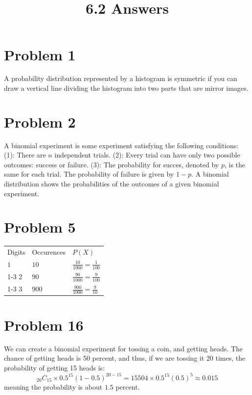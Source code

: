 \documentclass{article}
\title{6.2 Answers}
\theoremstyle{definition}
\newcommand{\?}{\stackrel{?}{=}}
\begin{document}
\maketitle

\section*{Problem 1}
A probability distribution represented by a histogram is symmetric if you can draw a vertical line dividing the histogram into two parts that 
are mirror images.

\section*{Problem 2}
A binomial experiment is some experiment satisfying the following conditions:\newline
(1): There are $n$ independent trials.\newline
(2): Every trial can have only two possible outcomes: success or failure.\newline
(3): The probability for succes, denoted by $p$, is the same for each trial. The probability of failure is given by $1-p$.\newline
A binomial distribution shows the probabilities of the outcomes of a given binomial experiment.

\section*{Problem 5}
\begin{center}
\begin{tabular}{l|l|l}
Digits & Occurences & $P(X)$ \\
$1$ & $10$ & $\frac{10}{1000}=\frac{1}{100}$ \\
\cmidrule{1-3}
$2$ & $90$ & $\frac{90}{1000}=\frac{9}{100}$ \\
\cmidrule{1-3}
$3$ & $900$ & $\frac{900}{1000}=\frac{9}{10}$ \\
\end{tabular}
\end{center}


\section*{Problem 16}
We can create a binomial experiment for tossing a coin, and getting heads. The chance of getting heads is 50 percent, and thus, if we are tossing it 
20 times, the probability of getting 15 heads is: 
\[ _{20}C_{15}\times 0.5^{15}\left(1-0.5\right)^{20-15}=15504\times 0.5^{15}(0.5)^{5}\approx 0.015 \] meaning the probability is about $1.5$ percent.
\end{document}
